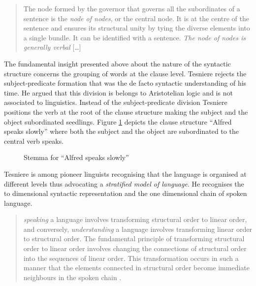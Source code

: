 \begin{quotation}
    The node formed by the governor that governs all the subordinates of a sentence is the \textit{node of nodes}, or the central node. It is at the centre of the sentence and ensures its structural unity by tying the diverse elements into a single bundle. It can be identified with a sentence. \textit{The node of nodes is generally verbal} [\dots] \citep[7]{Tesniere2015}
\end{quotation}

The fundamental insight presented above about the nature of the syntactic structure concerns the grouping of words at the clause level. Tesniere rejects the subject-predicate formation that was the de facto syntactic understanding of his time. He argued that this division is belongs to Aristotelian logic and is not associated to linguistics. Instead of the subject-predicate division Tesniere positions the verb at the root of the clause structure making the subject and the object subordinated seedlings. Figure \ref{fig:stemma2} depicts the clause structure ``Alfred speaks slowly'' where both the subject and the object are subordinated to the central verb speaks. 

\begin{figure}[!ht]
    \centering
    \caption{Stemma for ``Alfred speaks slowly''}
    \label{fig:stemma2}
\end{figure}

Tesniere is among pioneer linguists recognising that the language is organised at different levels thus advocating a \textit{stratified model of language}. He recognises the to dimensional syntactic representation and the one dimensional chain of spoken language. 

\begin{quotation}
    \textit{speaking} a language involves transforming structural order to linear order, and conversely, \textit{understanding} a language involves transforming linear order to structural order. The fundamental principle of transforming structural order to linear order involves changing the connections of structural order into the sequences of linear order. This transformation occurs in such a manner that the elements connected in structural order become immediate neighbours in the spoken chain \citep[12]{Tesniere2015}.
\end{quotation}

